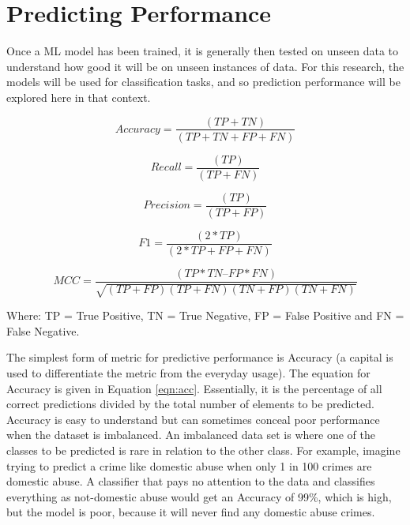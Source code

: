 \section{Predicting Performance} Once a ML model has been trained, it is generally then tested on unseen data to understand how good it will be on unseen instances of data. For this research, the models will be used for classification tasks, and so prediction performance will be explored here in that context.

\begin{equation}
Accuracy =  \frac{(TP+TN)}{(TP + TN + FP + FN)}
\label{eqn:acc}
\end{equation}

\begin{equation}
Recall =  \frac{(TP)}{(TP + FN)}
\label{eqn:recall_1}
\end{equation}

\begin{equation}
Precision=  \frac{(TP)}{(TP + FP)}
\label{eqn:prec}
\end{equation}

\begin{equation}
F1 =  \frac{(2 * TP)}{(2*TP + FP + FN)}
\label{eqn:f1}
\end{equation}

\begin{equation}
MCC =  \frac{(TP*TN – FP*FN)}{\sqrt{(TP+FP)(TP+FN)(TN+FP)(TN+FN)}}
\label{eqn:mcc}
\end{equation}

Where: TP = True Positive, TN = True Negative, FP = False Positive and FN = False Negative.

The simplest form of metric for predictive performance is Accuracy (a capital  is used to differentiate the metric from the everyday usage). The equation for Accuracy is given in Equation \ref{eqn:acc}. Essentially, it is the percentage of all correct predictions divided by the total number of elements to be predicted. Accuracy is easy to understand but can sometimes conceal poor performance when the dataset is imbalanced. An imbalanced data set is where one of the classes to be predicted is rare in relation to the other class. For example, imagine trying to predict a crime like domestic abuse when only 1 in 100 crimes are domestic abuse. A classifier that pays no attention to the data and classifies everything as not-domestic abuse would get an Accuracy of 99\%, which is high, but the model is poor, because it will never find any domestic abuse crimes.

